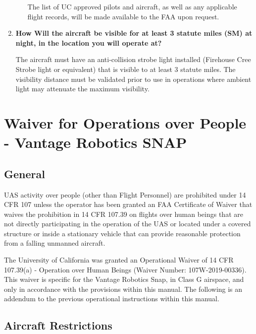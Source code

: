 \documentclass[
]{book}
\begin{document}
\begin{enumerate}
\begin{enumerate}
    The list of UC approved pilots and aircraft, as well as any applicable flight records, will be made available to the FAA upon request.
  \end{enumerate}
\item
  \textbf{How Will the aircraft be visible for at least 3 statute miles (SM) at night, in the location you will operate at?}

  The aircraft must have an anti-collision strobe light installed (Firehouse Cree Strobe light or equivalent) that is visible to at least 3 statute miles. The visibility distance must be validated prior to use in operations where ambient light may attenuate the maximum visibility.
\end{enumerate}

\hypertarget{ch-part39-vantage}{%
\chapter{Waiver for Operations over People - Vantage Robotics SNAP}\label{ch-part39-vantage}}

\hypertarget{s39v-gen}{%
\section{General}\label{s39v-gen}}

UAS activity over people (other than Flight Personnel) are prohibited under 14 CFR 107 unless the operator has been granted an FAA Certificate of Waiver that waives the prohibition in 14 CFR 107.39 on flights over human beings that are not directly participating in the operation of the UAS or located under a covered structure or inside a stationary vehicle that can provide reasonable protection from a falling unmanned aircraft.

The University of California was granted an Operational Waiver of 14 CFR 107.39(a) - Operation over Human Beings (Waiver Number: 107W-2019-00336). This waiver is specific for the Vantage Robotics Snap, in Class G airspace, and only in accordance with the provisions within this manual. The following is an addendum to the previous operational instructions within this manual.

\hypertarget{s39v-ar}{%
\section{Aircraft Restrictions}\label{s39v-ar}}
\end{document}
